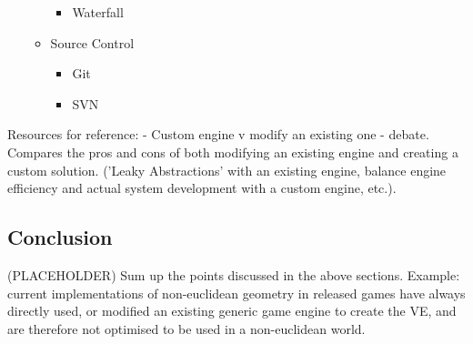 \begin{multicols*}{2}
\begin{itemize}
\begin{itemize}
\begin{itemize}
					\item Waterfall
				\end{itemize}
				\item Source Control
				\begin{itemize}
					\item Git
					\item SVN
				\end{itemize}
			\end{itemize}
		\end{itemize}
		Resources for reference:
		\cite{Bruce2012} - Custom engine v modify an existing one - debate. Compares the pros and cons of both modifying an existing engine and creating a custom solution. ('Leaky Abstractions' with an existing engine, balance engine efficiency and actual system development with a custom engine, etc.).
		
	\subsection{Conclusion}
	\label{lr:cross:conclusion}
		
		(PLACEHOLDER) Sum up the points discussed in the above sections. Example: current implementations of non-euclidean geometry in released games have always directly used, or modified an existing generic game engine to create the VE, and are therefore not optimised to be used in a non-euclidean world.
	
\end{multicols*}